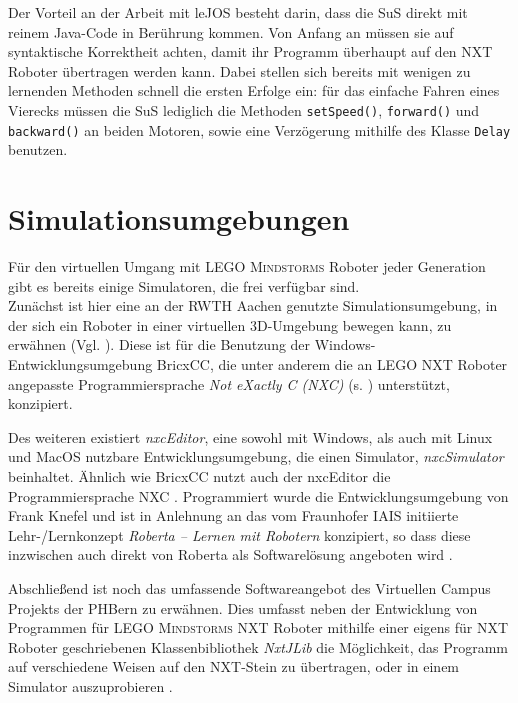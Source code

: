 \documentclass[paper=a4, pagesize, DIV=calc, BCOR=15mm, twoside=on, onecolumn=on, open = right, titlepage =on, parskip =half-, headsepline = on, footsepline = on, chapterprefix = on, appendixprefix = off, fontsize = 12pt, numbers = noenddot, abstract = on]{scrbook}
\numberwithin{equation}{chapter}
\theoremstyle{definition}
\theoremstyle{plain}
\theoremstyle{plain}
\theoremstyle{remark}
\theoremstyle{plain}
\theoremstyle{plain}
\begin{document}
Der Vorteil an der Arbeit mit leJOS besteht darin, dass die SuS direkt mit reinem Java-Code in Berührung kommen. Von Anfang an müssen sie auf syntaktische Korrektheit achten, damit ihr Programm überhaupt auf den NXT Roboter übertragen werden kann. Dabei stellen sich bereits mit wenigen zu lernenden Methoden schnell die ersten Erfolge ein: für das einfache Fahren eines Vierecks müssen die SuS lediglich die  Methoden \texttt{setSpeed()}, \texttt{forward()} und \texttt{backward()} an beiden Motoren, sowie eine Verzögerung mithilfe des Klasse \texttt{Delay} benutzen. 



\par \singlespacing
\section{Simulationsumgebungen}
\label{sec:simulationsumgebungen}
\onehalfspacing
Für den virtuellen Umgang mit \textsc{LEGO Mindstorms} Roboter jeder Generation gibt es bereits einige Simulatoren, die frei verfügbar sind.\\
Zunächst ist hier eine an der RWTH Aachen genutzte Simulationsumgebung, in der sich ein Roboter in einer virtuellen 3D-Umgebung bewegen kann, zu erwähnen (Vgl. \cite{rwth}). Diese ist für die Benutzung der Windows-Entwicklungsumgebung BricxCC, die unter anderem die an \textsc{LEGO} NXT Roboter angepasste Programmiersprache \emph{Not eXactly C (NXC)} (s. \cite{bricxcc}) unterstützt, konzipiert.

Des weiteren existiert \emph{nxcEditor}, eine sowohl mit Windows, als auch mit Linux und MacOS nutzbare Entwicklungsumgebung, die einen Simulator, \emph{nxcSimulator} beinhaltet. Ähnlich wie BricxCC nutzt auch der nxcEditor die Programmiersprache NXC \cite{nxceditor}. Programmiert wurde die Entwicklungsumgebung von Frank Knefel und ist in Anlehnung an das vom Fraunhofer IAIS initiierte Lehr-/Lernkonzept \emph{Roberta -- Lernen mit Robotern} konzipiert, so dass diese inzwischen auch direkt von Roberta als Softwarelösung angeboten wird \cite{roberta}.

Abschließend ist noch das umfassende Softwareangebot des Virtuellen Campus Projekts der PHBern zu erwähnen. Dies umfasst neben der Entwicklung von Programmen für \textsc{LEGO Mindstorms} NXT Roboter mithilfe einer eigens für NXT Roboter geschriebenen Klassenbibliothek \emph{NxtJLib} \cite{aegidius:16} die Möglichkeit, das Programm auf verschiedene Weisen auf den NXT-Stein zu übertragen, oder in einem Simulator auszuprobieren \cite{phbern}. 
\end{document}
